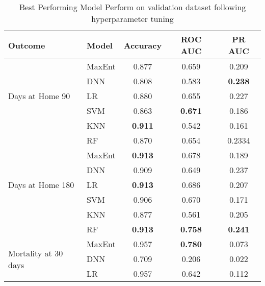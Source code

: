 \documentclass{article}
\begin{document}
\begin{table}[htbp]
    \centering
    \caption{Best Performing Model Perform on validation dataset following hyperparameter tuning}
    \begin{tabular}{llccc}
        \hline
        Outcome                                 & Model  & Accuracy       & ROC AUC        & PR AUC         \\
        \hline
        \multirow{5}{*}{Days at Home 90}        & MaxEnt & 0.877          & 0.659          & 0.209          \\
                                                & DNN    & 0.808          & 0.583          & \textbf{0.238} \\
                                                & LR     & 0.880          & 0.655          & 0.227          \\
                                                & SVM    & 0.863          & \textbf{0.671} & 0.186          \\
                                                & KNN    & \textbf{0.911} & 0.542          & 0.161          \\
                                                & RF     & 0.870          & 0.654          & 0.2334         \\
        \hline
        \multirow{5}{*}{Days at Home 180}       & MaxEnt & \textbf{0.913} & 0.678          & 0.189          \\
                                                & DNN    & 0.909          & 0.649          & 0.237          \\
                                                & LR     & \textbf{0.913} & 0.686          & 0.207          \\
                                                & SVM    & 0.906          & 0.670          & 0.171          \\
                                                & KNN    & 0.877          & 0.561          & 0.205          \\
                                                & RF     & \textbf{0.913} & \textbf{0.758} & \textbf{0.241} \\
        \hline
        \multirow{5}{*}{Mortality at 30 days}   & MaxEnt & 0.957          & \textbf{0.780} & 0.073          \\
                                                & DNN    & 0.709          & 0.206          & 0.022          \\
                                                & LR     & 0.957          & 0.642          & 0.112          \\

\end{tabular}
\end{table}
\end{document}
